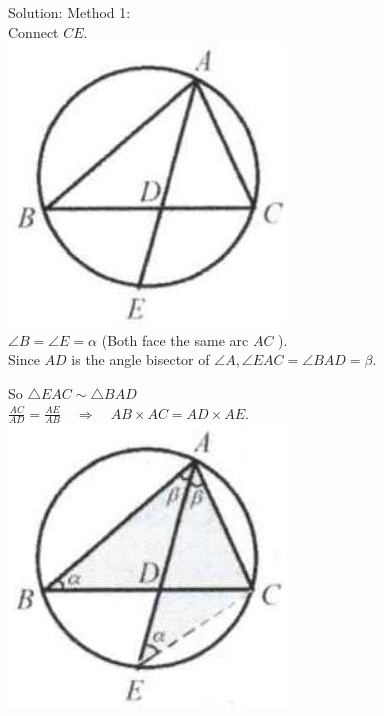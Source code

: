 \documentclass[10pt]{article}
\begin{document}
Solution:
Method 1:\\
Connect \(C E\).\\
\includegraphics[max width=\textwidth, center]{2025_04_17_97bc1f7e44d93c271a88g-165(1)}\\
\(\angle B=\angle E=\alpha\) (Both face the same arc \(A C\) ).\\
Since \(A D\) is the angle bisector of \(\angle A, \angle E A C=\angle B A D=\beta\).

So \(\triangle E A C \sim \triangle B A D\)\\
\(\frac{A C}{A D}=\frac{A E}{A B} \quad \Rightarrow \quad A B \times A C=A D \times A E\).\\
\includegraphics[max width=\textwidth, center]{2025_04_17_97bc1f7e44d93c271a88g-165}
\end{document}
